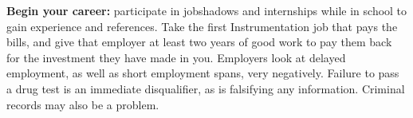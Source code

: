 \vskip 10pt

\noindent
{\bf Begin your career:} participate in jobshadows and internships while in school to gain experience and references.  Take the first Instrumentation job that pays the bills, and give that employer at least two years of good work to pay them back for the investment they have made in you.  Employers look at delayed employment, as well as short employment spans, very negatively.  Failure to pass a drug test is an immediate disqualifier, as is falsifying any information.  Criminal records may also be a problem.








\vfil

\eject

